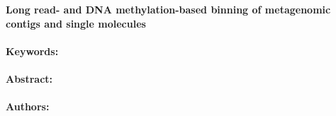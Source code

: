 \noindent
\large {\bf Long read- and DNA methylation-based binning of metagenomic contigs and single molecules} 


\normalsize 


\noindent \paragraph{Keywords:} 

\noindent \paragraph{Abstract:} 



\noindent \paragraph{Authors:} 

